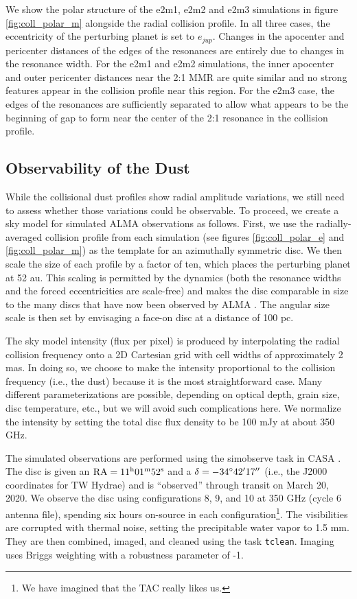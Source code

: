 \documentclass[fleqn,usenatbib]{mnras}
\begin{document}
We show the polar structure of the e2m1, e2m2 and e2m3 simulations in figure \ref{fig:coll_polar_m} alongside the radial collision profile. In all three 
cases, the eccentricity of the perturbing planet is set to $e_{jup}$. Changes in the apocenter and pericenter distances of the edges of the 
resonances are entirely due to changes in the resonance width. For the e2m1 and e2m2 simulations, the inner apocenter and outer pericenter 
distances near the 2:1 MMR are quite similar and no strong features appear in the collision profile near this region. For the e2m3 case, the edges of
the resonances are sufficiently separated to allow what appears to be the beginning of gap to form near the center of the 2:1 resonance in the collision profile.

\subsection{Observability of the Dust}

While the collisional dust profiles show radial amplitude variations, we still need to assess whether those variations could be observable. To proceed, 
we create a sky model for simulated ALMA observations as follows. First, we use the radially-averaged collision profile from each simulation (see figures 
\ref{fig:coll_polar_e} and \ref{fig:coll_polar_m}) as the template for an azimuthally symmetric disc. We then scale the size of each profile by a factor of 
ten, which places the perturbing planet at 52 au. This scaling is permitted by the dynamics (both the resonance widths and the forced eccentricities 
are scale-free) and makes the disc comparable in size to the many discs that have now been observed by ALMA \citep{2018ApJ...869L..42H}. The 
angular size scale is then set by envisaging a face-on disc at a distance of 100 pc.  

The sky model intensity (flux per pixel) is produced by interpolating the radial collision frequency onto a 2D Cartesian grid with cell widths of 
approximately 2 mas. In doing so, we choose to make the intensity proportional to the collision frequency (i.e., the dust) because it is the most 
straightforward case. Many different parameterizations are possible, depending on optical depth, grain size, disc temperature, etc., but we will avoid 
such complications here. We normalize the intensity by setting the total disc flux density to be 100 mJy at about 350 GHz.  

The simulated observations are performed using the {\sc simobserve} task in {\sc CASA} \citep{2007ASPC..376..127M}.  The disc is given an 
$\rm RA = 11^{\rm h} 01^{\rm m} 52^{\rm s}$ and a $\delta = -34^\circ 42\hbox{$^\prime$} 17\hbox{$^{\prime\prime}$}$ (i.e., the J2000 coordinates for TW Hydrae) and is 
``observed'' through transit on March 20, 2020. We observe the disc using configurations 8, 9, and 10 at 350 GHz (cycle 6 antenna file), spending six 
hours on-source in each configuration\footnote{We have imagined that the TAC really likes us.}.  The visibilities are corrupted with thermal noise, 
setting the precipitable water vapor to 1.5 mm. They are then combined, imaged, and cleaned
using the task {\tt tclean}. Imaging uses Briggs weighting with a robustness 
parameter of -1. 
\end{document}
